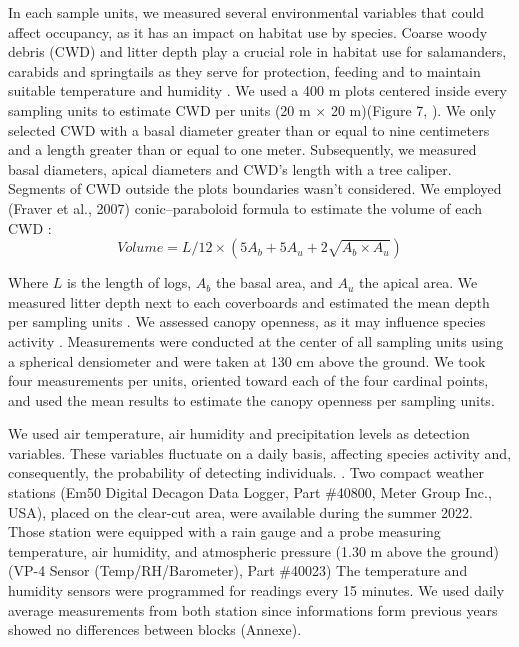 In each sample units, we measured several environmental variables that could affect occupancy, as it has an impact on habitat use by species.
Coarse woody debris (CWD) and litter depth play a crucial role in habitat use for salamanders, carabids and springtails as
they serve for protection, feeding and to maintain suitable temperature and humidity \citep{birdChangesSoilLitter2004,groverInfluenceCoverMoisture1998a,harmonEcologyCoarseWoody1986,koivula.LeafLitterSmallscale1999,mckennyEffectsStructuralComplexity2006,patrickEffectsExperimentalForestry2006a}. 
We used a 400 m plots centered inside every sampling units to estimate CWD per units (20 m $\times$  20 m)(Figure 7, \citealp{methotGuideInventaireEchantillonnage2014}). 
We only selected CWD with a basal diameter greater than or equal to nine centimeters and a length greater than or equal to one meter.
Subsequently, we measured basal diameters, apical diameters and CWD's length with a tree caliper. 
Segments of CWD outside the plots boundaries wasn't considered.
We employed (Fraver et al., 2007) conic–paraboloid formula to estimate the volume of each CWD :
\[Volume = L/12 \times (5A_b + 5A_u + 2\sqrt{A_b \times A_u})\]

Where $L$ is the length of logs, $A_b$ the basal area, and $A_u$ the apical area.
We measured litter depth next to each coverboards and estimated the mean depth per sampling units \citep{mazerolleWoodlandSalamanderPopulation2021a}. 
We assessed canopy openness, as it may influence species activity \citep{henneronForestPlantCommunity2017,koivulaBorealCarabidbeetleColeoptera2002a,kotzeFortyYearsCarabid2011a,messereForestFloorDistribution1998,tilghmanMetaanalysisEffectsCanopy2012}.
Measurements were conducted at the center of all sampling units using a spherical densiometer \citep{lemmonSphericalDensiometerEstimating1956} and were taken at 130 cm above the ground. 
We took four measurements per units, oriented toward each of the four cardinal points, and used the mean results to estimate the canopy openness per sampling units.

We used air temperature, air humidity and precipitation levels as detection variables.
These variables fluctuate on a daily basis, affecting species activity and, consequently, the probability of detecting individuals. 
\citep{butterfieldCarabidLifeCycle1996,kotzeFortyYearsCarabid2011a,loveiEcologyBehaviorGround1996,odonnellPredictingVariationMicrohabitat2014a,spotilaRoleTemperatureWater1972}.
Two compact weather stations (Em50 Digital Decagon Data Logger, Part \#40800, Meter Group Inc., USA), placed on the clear-cut area, were available during the summer 2022.
Those station were equipped with a rain gauge and a probe measuring temperature, air humidity, and atmospheric pressure (1.30 m above the ground)(VP-4 Sensor (Temp/RH/Barometer), Part \#40023)
The temperature and humidity sensors were programmed for readings every 15 minutes. 
We used daily average measurements from both station since informations form previous years showed no differences between blocks (Annexe).



